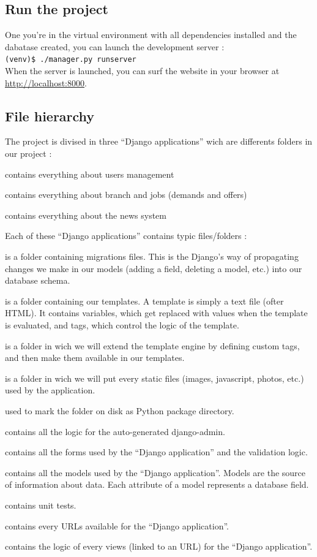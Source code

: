 \documentclass[11pt, a4paper]{article}   	%
\newcommand{\vshellcmd}[1]{\\\indent\indent\texttt{\footnotesize(venv)\$ #1}\\}
\begin{document}
\subsection{Run the project}
One you're in the virtual environment with all dependencies installed and the dabatase created, you can launch the development server :
\vshellcmd{./manager.py runserver}
When the server is launched, you can surf the website in your browser at \url{http://localhost:8000}. 

\subsection{File hierarchy}
The project is divised in three ``Django applications'' wich are differents folders in our project :
\begin{description}[noitemsep]
\item[- main] contains everything about users management
\item[- branch] contains everything about branch and jobs (demands and offers)
\item[- news] contains everything about the news system
\end{description}

Each of these ``Django applications'' contains typic files/folders :
\begin{description}[noitemsep]
\item[- migrations/] is a folder containing migrations files. This is the Django’s way of propagating changes we make in our models (adding a field, deleting a model, etc.) into our database schema.
\item[- templates/] is a folder containing our templates. A template is simply a text file (ofter HTML). It contains variables, which get replaced with values when the template is evaluated, and tags, which control the logic of the template.
\item[- Templatestags/] is a folder in wich we will extend the template engine by defining custom tags, and then make them available in our templates.
\item[- static/] is a folder in wich we will put every static files (images, javascript, photos, etc.) used by the application.
\item[- \_\_init\_\_.py] used to mark the folder on disk as Python package directory.
\item[- admin.py] contains all the logic for the auto-generated django-admin.
\item[- forms.py] contains all the forms used by the ``Django application'' and the validation logic.
\item[- models.py] contains all the models used by the ``Django application''. Models are the source of information about data. Each attribute of a model represents a database field. 
\item[- tests.py] contains unit tests.
\item[- urls.py] contains every URLs available for the ``Django application''.
\item[- views.py] contains the logic of every views (linked to an URL) for the ``Django application''.
\end{description}
\end{document}
